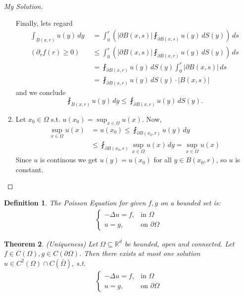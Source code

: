 \documentclass{report}
\theoremstyle{tommy}
\newtheorem{defn}{Definition}
\newtheorem{thm}[defn]{Theorem}
\begin{document}
\begin{proof}[My Solution]
\begin{enumerate}[label=\alph*)]
      Finally, lets regard
      \begin{align*}
        \int_{B(x, r)} u(y) \, dy
        &= \int_0^r \left(|\partial B(x,s)| \fint_{\partial B(x, s)} u(y) \, dS(y)\right) \, ds \\
        (\partial_r f(r) \ge 0) \quad &\le \int_0^r \left(|\partial B(x,s)| \fint_{\partial B(x, r)} u(y) \, dS(y)\right) \, ds \\
        &= \fint_{\partial B(x, r)} u(y)  \, dS(y) \int_0^r |\partial B(x,s)| \, ds \\
        &= \fint_{\partial B(x, r)} u(y)  \, dS(y) \cdot |B(x,s)|
      \end{align*}
      and we conclude
      \[\fint_{B(x, r)} u(y) \, dy \le \fint_{\partial B(x,r)} u(y) \, dS(y).\]
    \item Let \(x_0 \in \Omega\) s.t. \(u(x_0) = \sup_{x \in \Omega} u(x)\). Now, \begin{align*}
      \sup_{x \in \Omega} u(x) 
      &= u(x_0) 
      \le \fint_{\partial B(x_0, r)} u(y) \, dy \\
      &\le \fint_{\partial B(x_0, r)} \sup_{x \in \Omega} u(x) \, dy 
      = \sup_{x \in \Omega} u(x)
    \end{align*}
    Since \(u\) is continous we get \(u(y) = u(x_0)\) for all \(y \in B(x_0, r)\), so \(u\) is constant. \qedhere
  \end{enumerate}
\end{proof}

\begin{defn}
  The \emph{Poisson Equation} for given \(f, g\) on a bounded set is:
  \begin{align*}
    \begin{cases}
      - \Delta u = f, &\text{in } \Omega \\
      u = g, &\text{on } \partial \Omega
    \end{cases}
  \end{align*} 
\end{defn}

\begin{thm}(Uniqueness)
  Let \(\Omega \subseteq \mathbb{R}^d\) be bounded, open  and connected. Let \(f \in C(\Omega), g \in C(\partial \Omega)\). Then there exists \emph{at most} one solution \(u \in C^2(\Omega) \cap C(\bar \Omega)\), s.t. \begin{align*}
    \begin{cases}
      - \Delta u = f, &\text{in } \Omega \\
      u = g, &\text{on } \partial \Omega
    \end{cases}
  \end{align*}
\end{thm}
\end{document}

